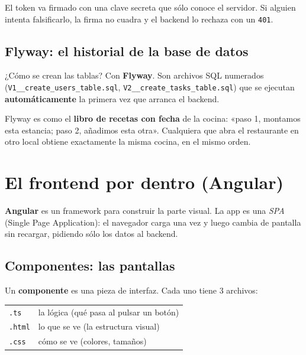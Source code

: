 \documentclass[11pt,a4paper]{article}
\begin{document}
\begin{nota}
El token va firmado con una clave secreta que sólo conoce el servidor. Si
alguien intenta falsificarlo, la firma no cuadra y el backend lo rechaza con un
\texttt{401}.
\end{nota}

\subsection{Flyway: el historial de la base de datos}

¿Cómo se crean las tablas? Con \textbf{Flyway}. Son archivos SQL numerados
(\verb|V1__create_users_table.sql|, \verb|V2__create_tasks_table.sql|) que se
ejecutan \textbf{automáticamente} la primera vez que arranca el backend.

\begin{analogia}
Flyway es como el \textbf{libro de recetas con fecha} de la cocina: «paso 1,
montamos esta estancia; paso 2, añadimos esta otra». Cualquiera que abra el
restaurante en otro local obtiene exactamente la misma cocina, en el mismo orden.
\end{analogia}

\section{El frontend por dentro (Angular)}

\textbf{Angular} es un framework para construir la parte visual. La app es una
\emph{SPA} (Single Page Application): el navegador carga una vez y luego cambia
de pantalla sin recargar, pidiendo sólo los datos al backend.

\subsection{Componentes: las pantallas}

Un \textbf{componente} es una pieza de interfaz. Cada uno tiene 3 archivos:

\begin{center}
\begin{tabular}{ll}
\texttt{.ts}   & la lógica (qué pasa al pulsar un botón) \\
\texttt{.html} & lo que se ve (la estructura visual) \\
\texttt{.css}  & cómo se ve (colores, tamaños) \\
\end{tabular}
\end{center}
\end{document}
